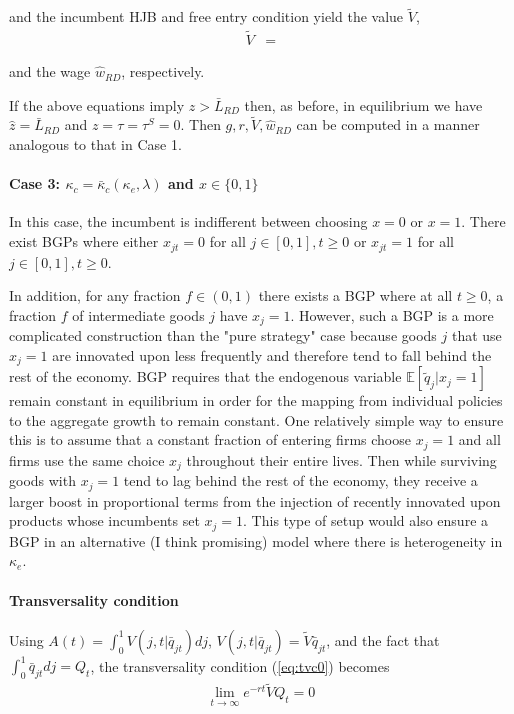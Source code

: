 \documentclass[11pt,english]{article}
\theoremstyle{remark}
\begin{document}
and the incumbent HJB and free entry condition yield the value $\tilde{V}$,
\begin{align}
	\tilde{V} &= 
\end{align} 

and the wage $\hat{w}_{RD}$, respectively. 

If the above equations imply $\hat{z} > \bar{L}_{RD}$ then, as before, in equilibrium we have $\hat{z} = \bar{L}_{RD}$ and $z = \tau = \tau^S = 0$. Then $g,r,\tilde{V},\hat{w}_{RD}$ can be computed in a manner analogous to that in Case 1.  

\paragraph{Case 3: $\kappa_c = \bar{\kappa}_c(\kappa_e,\lambda)$ and $x \in \{0,1\}$}

In this case, the incumbent is indifferent between choosing $x = 0$ or $x = 1$. There exist BGPs where either $x_{jt} = 0$ for all $j\in[0,1],t \ge 0$ or $x_{jt} = 1$ for all $j\in[0,1],t \ge 0$.

In addition, for any fraction $f \in (0,1)$ there exists a BGP where at all $t \ge 0$, a fraction $f$ of intermediate goods $j$ have $x_j = 1$. However, such a BGP is a more complicated construction than the "pure strategy" case because goods $j$ that use $x_j = 1$ are innovated upon less frequently and therefore tend to fall behind the rest of the economy. BGP requires that the endogenous variable $\mathbb{E}[\tilde{q}_j | x_j = 1]$ remain constant in equilibrium in order for the mapping from individual policies to the aggregate growth to remain constant. One relatively simple way to ensure this is to assume that a constant fraction of entering firms choose $x_j = 1$ and all firms use the same choice $x_j$ throughout their entire lives. Then while surviving goods with $x_j = 1$ tend to lag behind the rest of the economy, they receive a larger boost in proportional terms from the injection of recently innovated upon products whose incumbents set $x_j = 1$. This type of setup would also ensure a BGP in an alternative (I think promising) model where there is heterogeneity in $\kappa_e$. 

\paragraph{Transversality condition}

Using $A(t) = \int_0^1 V(j,t|\bar{q}_{jt}) dj$,  $V(j,t|\bar{q}_{jt}) = \tilde{V} \bar{q}_{jt}$, and the fact that $\int_0^1 \bar{q}_{jt} dj = Q_t$, the transversality condition (\ref{eq:tvc0}) becomes
\begin{align}
	\lim_{t \to \infty} e^{-rt} \tilde{V} Q_t = 0 \label{eq:tvc}
\end{align}
\end{document}
